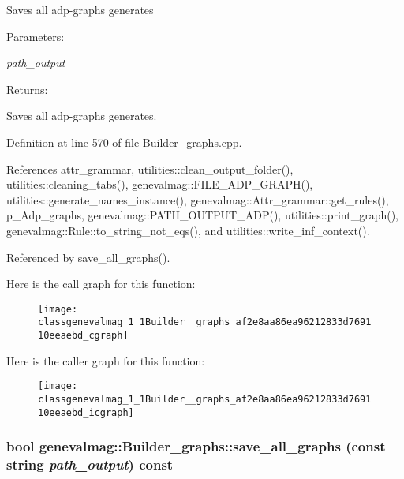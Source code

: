 Saves all adp-graphs generates \begin{Desc}
\item[Parameters:]
\begin{description}
\item[{\em path\_\-output}]\end{description}
\end{Desc}
\begin{Desc}
\item[Returns:]\end{Desc}
Saves all adp-graphs generates. 

Definition at line 570 of file Builder\_\-graphs.cpp.

References attr\_\-grammar, utilities::clean\_\-output\_\-folder(), utilities::cleaning\_\-tabs(), genevalmag::FILE\_\-ADP\_\-GRAPH(), utilities::generate\_\-names\_\-instance(), genevalmag::Attr\_\-grammar::get\_\-rules(), p\_\-Adp\_\-graphs, genevalmag::PATH\_\-OUTPUT\_\-ADP(), utilities::print\_\-graph(), genevalmag::Rule::to\_\-string\_\-not\_\-eqs(), and utilities::write\_\-inf\_\-context().

Referenced by save\_\-all\_\-graphs().

Here is the call graph for this function:\nopagebreak
\begin{figure}[H]
\begin{center}
\leavevmode
\texttt{[image: classgenevalmag\_1\_1Builder\_\_graphs\_af2e8aa86ea96212833d769110eeaebd\_cgraph]}
\end{center}
\end{figure}


Here is the caller graph for this function:\nopagebreak
\begin{figure}[H]
\begin{center}
\leavevmode
\texttt{[image: classgenevalmag\_1\_1Builder\_\_graphs\_af2e8aa86ea96212833d769110eeaebd\_icgraph]}
\end{center}
\end{figure}
\hypertarget{classgenevalmag_1_1Builder__graphs_95525c606a1189a5fe0096f72938555d}{
\subsubsection[{save\_\-all\_\-graphs}]{\setlength{\rightskip}{0pt plus 5cm}bool genevalmag::Builder\_\-graphs::save\_\-all\_\-graphs (const string {\em path\_\-output}) const}}
\label{classgenevalmag_1_1Builder__graphs_95525c606a1189a5fe0096f72938555d}


